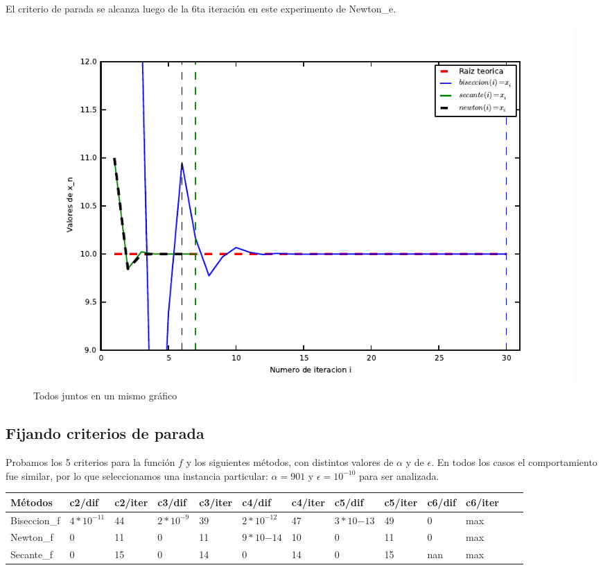 El criterio de parada se alcanza luego de la 6ta iteración en este experimento de Newton\_e.

\begin{figure}[!h]
	\begin{center}
		  \includegraphics[keepaspectratio]{../Imagenes/exp2/todos_juntos.pdf}
		  \caption{Todos juntos en un mismo gráfico}
		  \label{fig:contra1}
	\end{center}
\end{figure}
\FloatBarrier

\subsection{Fijando criterios de parada}

Probamos los 5 criterios para la función $f$ y los siguientes métodos, con distintos valores de $\alpha$ y de $\epsilon$. En todos los casos el comportamiento fue similar, por lo que
seleccionamos una instancia particular: $\alpha = 901$ y $\epsilon=10^{-10}$ para ser analizada.

\begin{center}
    \small{
    \begin{tabular}{| l | l | l | l | l | l | l | l | l | l | l | l | l |}
    \hline
    Métodos & c2/dif & c2/iter & c3/dif & c3/iter & c4/dif & c4/iter & c5/dif & c5/iter & c6/dif & c6/iter \\ \hline
    Biseccion\_f & $4*10^{-11}$ & 44 & $2*10^{-9}$ & 39 & $2*10^{-12}$ & 47 & $3*10{-13}$ & 49 & 0 & max\\ \hline
    Newton\_f & 0 & 11 & 0 & 11 & $9*10{-14}$ & 10 & 0 & 11 & 0 & max \\ \hline
    Secante\_f & 0 & 15 & 0 & 14 & 0 & 14 & 0 & 15 & nan & max \\ \hline
    \end{tabular}
    }
\end{center}

